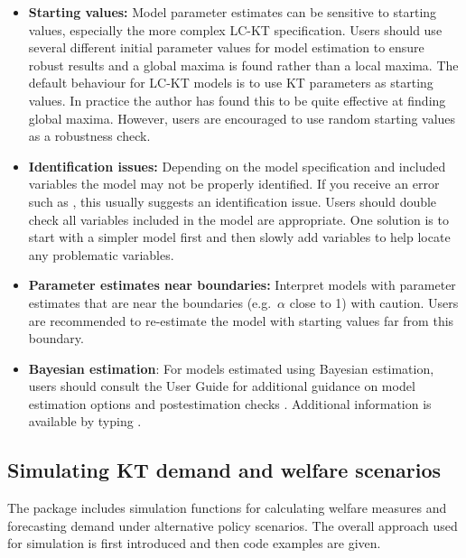 \begin{itemize}
\item
  \textbf{Starting values:} Model parameter estimates can be sensitive
  to starting values, especially the more complex LC-KT specification.
  Users should use several different initial parameter values for model
  estimation to ensure robust results and a global maxima is found
  rather than a local maxima. The default behaviour for LC-KT models is
  to use KT parameters as starting values. In practice the author has
  found this to be quite effective at finding global maxima. However,
  users are encouraged to use random starting values as a robustness
  check.
\item
  \textbf{Identification issues:} Depending on the model specification
  and included variables the model may not be properly identified. If
  you receive an error such as
  ,
  this usually suggests an identification issue. Users should double
  check all variables included in the model are appropriate. One
  solution is to start with a simpler model first and then slowly add
  variables to help locate any problematic variables.
\item
  \textbf{Parameter estimates near boundaries:} Interpret models with
  parameter estimates that are near the boundaries (e.g.~\(\alpha\)
  close to 1) with caution. Users are recommended to re-estimate the
  model with starting values far from this boundary.
\item
  \textbf{Bayesian estimation}: For models estimated using Bayesian
  estimation, users should consult the  User Guide for
  additional guidance on model estimation options and postestimation
  checks \citep{stan2019}. Additional information is available by typing
  .
\end{itemize}

\hypertarget{simulating-kt-demand-and-welfare-scenarios}{%
\subsection{Simulating KT demand and welfare
scenarios}\label{simulating-kt-demand-and-welfare-scenarios}}

The  package includes simulation functions for calculating
welfare measures and forecasting demand under alternative policy
scenarios. The overall approach used for simulation is first introduced
and then code examples are given.

